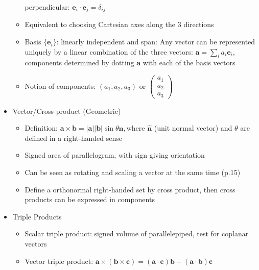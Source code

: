 \begin{itemize}
\begin{itemize}
                        perpendicular: $\mathbf{e}_{i}\cdot\mathbf{e}_{j}=\delta_{ij}$
                  \item Equivalent to choosing Cartesian axes along the 3 directions
                  \item Basis $\{\mathbf{e}_{i}\}$: linearly independent and span: Any vector
                        can be represented uniquely by a linear combination of the three vectors:
                        ${\displaystyle \mathbf{a}=\sum_{i}a_{i}\mathbf{e}_{i}}$, components
                        determined by dotting $\mathbf{a}$ with each of the basis vectors
                  \item Notion of components: $(a_{1},a_{2},a_{3})$ or $\left(\begin{array}{c}
                                          a_{1} \\
                                          a_{2} \\
                                          a_{3}
                                    \end{array}\right)$
            \end{itemize}
      \item Vector/Cross product (Geometric)
            \begin{itemize}
                  \item Definition: $\mathbf{a\times b}=|\mathbf{a}||\mathbf{b}|\sin\theta\mathbf{\hat{n}},$where
                        $\mathbf{\hat{n}}$ (unit normal vector) and $\theta$ are defined
                        in a right-handed sense
                  \item Signed area of parallelogram, with sign giving orientation
                  \item Can be seen as rotating and scaling a vector at the same time (p.15)
                  \item Define a orthonormal right-handed set by cross product, then cross
                        products can be expressed in components
            \end{itemize}
      \item Triple Products
            \begin{itemize}
                  \item Scalar triple product: signed volume of parallelepiped, test for coplanar
                        vectors
                  \item Vector triple product: $\mathbf{a\times}(\mathbf{b}\times\mathbf{c})=(\mathbf{a\cdot c})\mathbf{b}-(\mathbf{a}\cdot\mathbf{b})\mathbf{c}$

\end{itemize}
\end{itemize}
